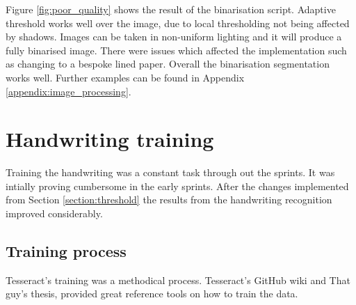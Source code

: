 Figure \ref{fig:poor_quality} shows the result of the binarisation script. Adaptive threshold works well over the image, due to local thresholding not being affected by shadows. Images can be taken in non-uniform lighting and it will produce a fully binarised image. There were issues which affected the implementation such as changing to a bespoke lined paper. Overall the binarisation segmentation works well. Further examples can be found in Appendix \ref{appendix:image_processing}.

\section{Handwriting training}
Training the handwriting was a constant task through out the sprints. It was intially proving cumbersome in the early sprints. After the changes implemented from Section \ref{section:threshold} the results from the handwriting recognition improved considerably.

\subsection{Training process}
Tesseract's training was a methodical process. Tesseract's GitHub wiki and That guy's thesis, provided great reference tools on how to train the data.


